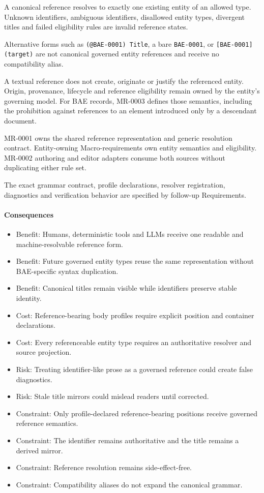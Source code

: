 \documentclass[
  10pt,
]{article}
\providecommand{\tightlist}{%
  \setlength{\itemsep}{0pt}\setlength{\parskip}{0pt}}
\begin{document}
A canonical reference resolves to exactly one existing entity of an
allowed type. Unknown identifiers, ambiguous identifiers, disallowed
entity types, divergent titles and failed eligibility rules are invalid
reference states.

Alternative forms such as \texttt{(@BAE-0001)\ Title}, a bare
\texttt{BAE-0001}, or \texttt{{[}BAE-0001{]}(target)} are not canonical
governed entity references and receive no compatibility alias.

A textual reference does not create, originate or justify the referenced
entity. Origin, provenance, lifecycle and reference eligibility remain
owned by the entity's governing model. For BAE records, MR-0003 defines
those semantics, including the prohibition against references to an
element introduced only by a descendant document.

MR-0001 owns the shared reference representation and generic resolution
contract. Entity-owning Macro-requirements own entity semantics and
eligibility. MR-0002 authoring and editor adapters consume both sources
without duplicating either rule set.

The exact grammar contract, profile declarations, resolver registration,
diagnostics and verification behavior are specified by follow-up
Requirements.

\paragraph{Consequences}\label{consequences-12}

\begin{itemize}
\tightlist
\item
  Benefit: Humans, deterministic tools and LLMs receive one readable and
  machine-resolvable reference form.
\item
  Benefit: Future governed entity types reuse the same representation
  without BAE-specific syntax duplication.
\item
  Benefit: Canonical titles remain visible while identifiers preserve
  stable identity.
\item
  Cost: Reference-bearing body profiles require explicit position and
  container declarations.
\item
  Cost: Every referenceable entity type requires an authoritative
  resolver and source projection.
\item
  Risk: Treating identifier-like prose as a governed reference could
  create false diagnostics.
\item
  Risk: Stale title mirrors could mislead readers until corrected.
\item
  Constraint: Only profile-declared reference-bearing positions receive
  governed reference semantics.
\item
  Constraint: The identifier remains authoritative and the title remains
  a derived mirror.
\item
  Constraint: Reference resolution remains side-effect-free.
\item
  Constraint: Compatibility aliases do not expand the canonical grammar.
\end{itemize}
\end{document}

